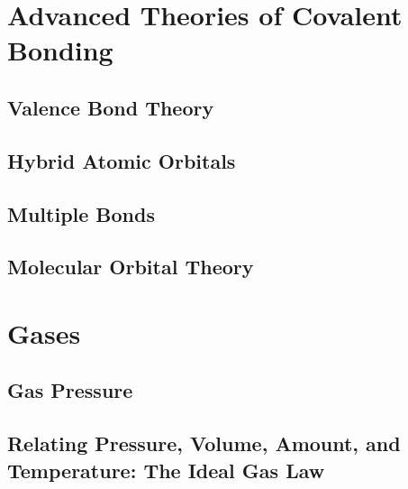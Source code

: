 \documentclass[12pt, openany, letterpaper]{memoir}
\begin{document}
\chapter{Advanced Theories of Covalent Bonding}

\section{Valence Bond Theory}

\section{Hybrid Atomic Orbitals}

\section{Multiple Bonds}

\section{Molecular Orbital Theory}

\chapter{Gases}

\section{Gas Pressure}

\section{Relating Pressure, Volume, Amount, and Temperature: The Ideal Gas Law}
\end{document}
